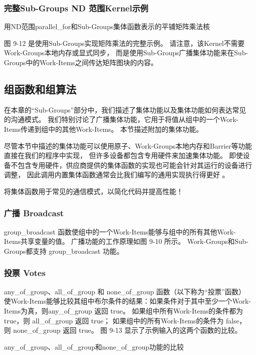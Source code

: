 \subsubsection{完整Sub-Groups ND 范围Kernel示例}
{\color{red} 用ND范围parallel\_for和Sub-Groups集体函数表示的平铺矩阵乘法核}

图 9-12 是使用Sub-Groups实现矩阵乘法的完整示例。 
请注意，该Kernel不需要Work-Groups本地内存或显式同步，
而是使用Sub-Groups广播集体功能来在Sub-Groups中的Work-Items之间传达矩阵图块的内容。

\subsection{组函数和组算法}
在本章的“Sub-Groups”部分中，我们描述了集体功能以及集体功能如何表达常见的沟通模式。 
我们特别讨论了广播集体功能，它用于将值从组中的一个Work-Items传递到组中的其他Work-Items。 本节描述附加的集体功能。

尽管本节中描述的集体功能可以使用原子、Work-Groups本地内存和Barrier等功能直接在我们的程序中实现，
但许多设备都包含专用硬件来加速集体功能。 
即使设备不包含专用硬件，供应商提供的集体函数的实现也可能会针对其运行的设备进行调整，
因此调用内置集体函数通常会比我们编写的通用实现执行得更好 。

\begin{remark}
	将集体函数用于常见的通信模式，以简化代码并提高性能！
\end{remark}

\subsubsection{广播 Broadcast}
group\_broadcast 函数使组中的一个Work-Items能够与组中的所有其他Work-Items共享变量的值。 
广播功能的工作原理如图 9-10 所示。 Work-Groups和Sub-Groups都支持 group\_broadcast 功能。

\subsubsection{投票 Votes}
any\_of\_group、all\_of\_group 和 none\_of\_group 函数（以下称为“投票”函数）
使Work-Items能够比较其组中布尔条件的结果：如果条件对于其中至少一个Work-Items为真，则any\_of\_group 返回 true。 
如果组中所有Work-Items的条件都为 true，则 all\_of\_group 返回 true；
如果组中的所有Work-Items的条件为 false，则 none\_of\_group 返回 true。 
图 9-13 显示了示例输入的这两个函数的比较。

{\color{red} any\_of\_group、all\_of\_group和none\_of\_group功能的比较}

